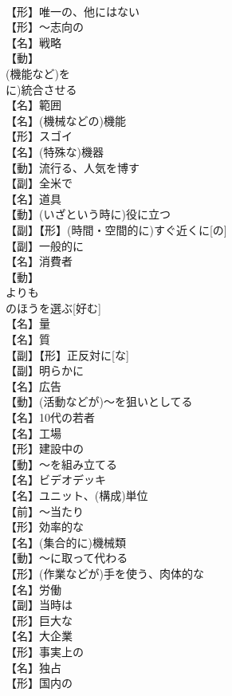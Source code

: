 \documentclass[8pt]{extreport}
\begin{document}
\begin{CJK}{UTF8}{min}
\\	【形】唯一の、他にはない
\\	【形】～志向の
\\	【名】戦略
\\	【動】
\\	(機能など)を
\\	に)統合させる
\\	【名】範囲
\\	【名】(機械などの)機能
\\	【形】スゴイ
\\	【名】(特殊な)機器
\\	【動】流行る、人気を博す
\\	【副】全米で
\\	【名】道具
\\	【動】(いざという時に)役に立つ
\\	【副】【形】(時間・空間的に)すぐ近くに[の]
\\	【副】一般的に
\\	【名】消費者
\\	【動】
\\	よりも
\\	のほうを選ぶ[好む]
\\	【名】量
\\	【名】質
\\	【副】【形】正反対に[な]
\\	【副】明らかに
\\	【名】広告
\\	【動】(活動などが)～を狙いとしてる
\\	【名】10代の若者
\\	【名】工場
\\	【形】建設中の
\\	【動】～を組み立てる
\\	【名】ビデオデッキ
\\	【名】ユニット、(構成)単位
\\	【前】～当たり
\\	【形】効率的な
\\	【名】(集合的に)機械類
\\	【動】～に取って代わる
\\	【形】(作業などが)手を使う、肉体的な
\\	【名】労働
\\	【副】当時は
\\	【形】巨大な
\\	【名】大企業
\\	【形】事実上の
\\	【名】独占
\\	【形】国内の

\end{CJK}
\end{document}
